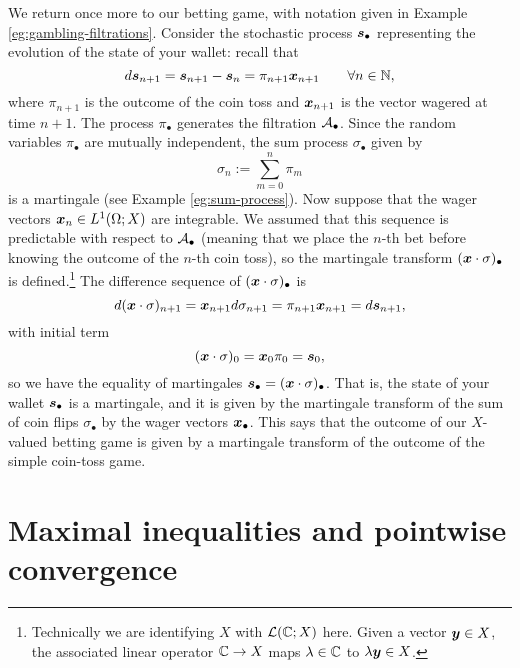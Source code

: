 \begin{example}\label{eg:betting-game-martingale}
  We return once more to our betting game, with notation given in Example \ref{eg:gambling-filtrations}.
  Consider the stochastic process $\bm{s}_\bullet$ representing the evolution of the state of your wallet: recall that
  \begin{equation*}
    d\bm{s}_{n+1} = \bm{s}_{n+1} - \bm{s}_{n} = \pi_{n+1} \bm{x}_{n+1} \qquad \forall n \in \mathbb{N},
  \end{equation*}
  where $\pi_{n+1}$ is the outcome of the coin toss and $\bm{x}_{n+1}$ is the vector wagered at time $n+1$.
  The process $\pi_{\bullet}$ generates the filtration $\mathcal{A}_{\bullet}$.
  Since the random variables $\pi_{\bullet}$ are mutually independent, the sum process $\sigma_{\bullet}$ given by
  \begin{equation*}
    \sigma_{n} := \sum_{m=0}^n \pi_{m}
  \end{equation*}
  is a martingale (see Example \ref{eg:sum-process}).
  Now suppose that the wager vectors $\bm{x}_n \in L^1(\Omega;X)$ are integrable.
  We assumed that this sequence is predictable with respect to $\mathcal{A}_{\bullet}$ (meaning that we place the $n$-th bet before knowing the outcome of the $n$-th coin toss), so the martingale transform $(\bm{x} \cdot \sigma)_{\bullet}$ is defined.\footnote{Technically we are identifying $X$ with $\mathcal{L}(\mathbb{C};X)$ here. Given a vector $\bm{y} \in X$, the associated linear operator $\mathbb{C} \to X$ maps $\lambda \in \mathbb{C}$ to $\lambda \bm{y} \in X$.}
  The difference sequence of $(\bm{x} \cdot \sigma)_{\bullet}$ is
  \begin{equation*}
    d(\bm{x} \cdot \sigma)_{n+1} = \bm{x}_{n+1} d\sigma_{n+1} = \pi_{n+1} \bm{x}_{n+1} = d\bm{s}_{n+1}, 
  \end{equation*}
  with initial term
  \begin{equation*}
    (\bm{x} \cdot \sigma)_0 = \bm{x}_{0} \pi_{0} = \bm{s}_{0},
  \end{equation*}
  so we have the equality of martingales $\bm{s}_{\bullet} = (\bm{x} \cdot \sigma)_{\bullet}$.
  That is, the state of your wallet $\bm{s}_{\bullet}$ is a martingale, and it is given by the martingale transform of the sum of coin flips $\sigma_{\bullet}$ by the wager vectors $\bm{x}_{\bullet}$.
  This says that the outcome of our $X$-valued betting game is given by a martingale transform of the outcome of the simple coin-toss game.
\end{example}


\section{Maximal inequalities and pointwise convergence}

